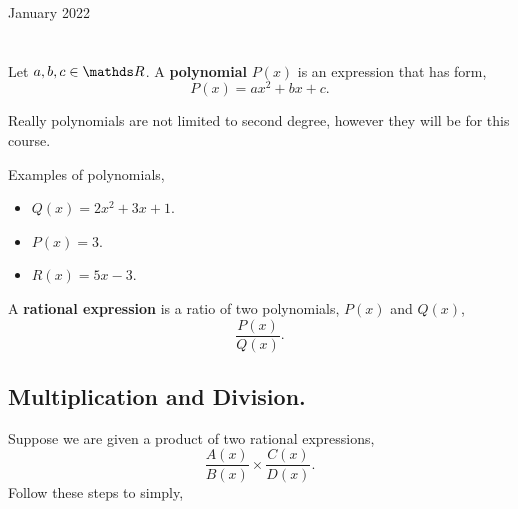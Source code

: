 \documentclass[12pt,oneside]{book} %
\newcounter{step}[section]
\begin{document}
	\renewcommand*{\term}{Term 2} %
	\renewcommand*{\coursecode}{MCR3U} %
	\renewcommand*{\coursename}{Course Name} %
	\renewcommand*{\thelecnum}{7} %
	\renewcommand*{\profname}{Prof Name} %
	\renewcommand*{\colink}{http://www.student.math.uwaterloo.ca/~c2kent} %
	\clearpage
	\pagestyle{classlecture}
\begin{lec}{January 2022}
	\chapter{\chapname\chaplec}

  \begin{defn}
      Let $a,b,c \in \R$. A \textbf{polynomial} $P(x)$ is an expression that has form,
        \[
            P(x) = ax^2 + bx + c
        .\] 
  \end{defn}

  \begin{rem}
      Really polynomials are not limited to second degree, however they will be for this course.
  \end{rem}

  \begin{ex}
    Examples of polynomials,
    \begin{itemize}
      \item $Q(x) = 2x^2 + 3x + 1$.
      \item $P(x) = 3$.
      \item $R(x) = 5x - 3$.
    \end{itemize}
  \end{ex}

  \begin{defn}
      A \textbf{rational expression} is a ratio of two polynomials, $P(x)$ and $Q(x)$, 
       \[
         \frac{P(x)}{Q(x)}
      .\] 
  \end{defn}

  \section{Multiplication and Division.}
  Suppose we are given a product of two rational expressions,
  \[
        \frac{A(x)}{B(x)} \times \frac{C(x)}{D(x)}
  .\] 
  Follow these steps to simply,


\end{lec}
\end{document}
